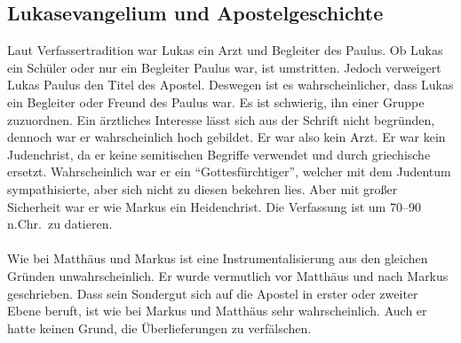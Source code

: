 \subsection*{Lukasevangelium und Apostelgeschichte}
Laut Verfassertradition war Lukas ein Arzt und Begleiter des Paulus. Ob Lukas ein Schüler oder nur ein Begleiter Paulus war, ist umstritten. Jedoch verweigert Lukas Paulus den Titel des Apostel. Deswegen ist es wahrscheinlicher, dass Lukas ein Begleiter oder Freund des Paulus war. Es ist schwierig, ihn einer Gruppe zuzuordnen. Ein ärztliches Interesse lässt sich aus der Schrift nicht begründen, dennoch war er wahrscheinlich hoch gebildet. Er war also kein Arzt. Er war kein Judenchrist, da er keine semitischen Begriffe verwendet und durch griechische ersetzt. Wahrscheinlich war er ein ``Gottesfürchtiger'', welcher mit dem Judentum sympathisierte, aber sich nicht zu diesen bekehren lies. Aber mit großer Sicherheit war er wie Markus ein Heidenchrist. Die Verfassung ist um 70--90 n.Chr.\ zu datieren.
\\~\\
Wie bei Matthäus und Markus ist eine Instrumentalisierung aus den gleichen Gründen unwahrscheinlich. Er wurde vermutlich vor Matthäus und nach Markus geschrieben. Dass sein Sondergut sich auf die Apostel in erster oder zweiter Ebene beruft, ist wie bei Markus und Matthäus sehr wahrscheinlich. Auch er hatte keinen Grund, die Überlieferungen zu verfälschen.

